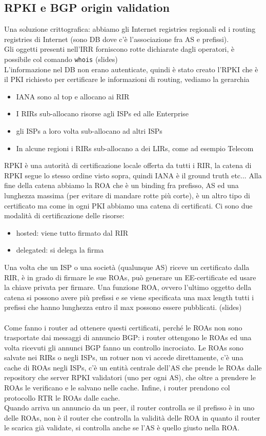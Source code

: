 \documentclass[12pt, oneside]{extbook} %
\begin{document}
\subsection{RPKI e BGP origin validation}
Una soluzione crittografica: abbiamo gli Internet registries regionali ed i routing registries di Internet (sono DB dove c'è l'associazione fra AS e prefissi).\\Gli oggetti presenti nell'IRR forniscono rotte dichiarate dagli operatori, è possibile col comando \texttt{whois} (slides)\\ L'informazione nel DB non erano autenticate, quindi è stato creato l'RPKI che è il PKI richiesto per certificare le informazioni di routing, vediamo la gerarchia 
\begin{itemize}
\item IANA sono al top e allocano ai RIR
\item I RIRs sub-allocano risorse agli ISPs ed alle Enterprise
\item gli ISPs a loro volta sub-allocano ad altri ISPs
\item In alcune regioni i RIRs sub-allocano a dei LIRs, come ad esempio Telecom
\end{itemize}
RPKI è una autorità di certificazione locale offerta da tutti i RIR, la catena di RPKI segue lo stesso ordine visto sopra, quindi IANA è il ground truth etc... Alla fine della catena abbiamo la ROA che è un binding fra prefisso, AS ed una lunghezza massima (per evitare di mandare rotte più corte), è un altro tipo di certificato ma come in ogni PKI abbiamo una catena di certificati. Ci sono due modalità di certificazione delle risorse:
\begin{itemize}
\item hosted: viene tutto firmato dal RIR
\item delegated: si delega la firma
\end{itemize}
Una volta che un ISP o una società (qualunque AS) riceve un certificato dalla RIR, è in grado di firmare le sue ROAs, può generare un EE-certificate ed usare la chiave privata per firmare. Una funzione ROA, ovvero l'ultimo oggetto della catena si possono avere più prefissi e se viene specificata una max length tutti i prefissi che hanno lunghezza entro il max possono essere pubblicati. (slides)\\\\Come fanno i router ad ottenere questi certificati, perché le ROAs non sono trasportate dai messaggi di annuncio BGP: i router ottengono le ROAs ed una volta ricevuti gli annunci BGP fanno un controllo incrociato. Le ROAs sono salvate nei RIRs o negli ISPs, un rotuer non vi accede direttamente, c'è una cache di ROAs negli ISPs, c'è un entità centrale dell'AS che prende le ROAs dalle repository che server RPKI validatori (uno per ogni AS), che oltre a prendere le ROAs le verificano e le salvano nelle cache. Infine, i router prendono col protocollo RTR le ROAs dalle cache.\\Quando arriva un annuncio da un peer, il router controlla se il prefisso è in uno delle ROAs, non è il router che controlla la validità delle ROA in quanto il router le scarica già validate, si controlla anche se l'AS è quello giusto nella ROA.
\end{document}
